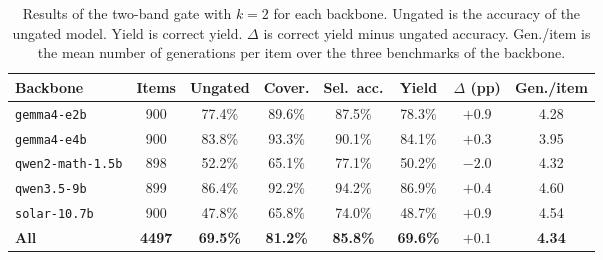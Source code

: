 \begin{table}[t]
\small\setlength{\tabcolsep}{3pt}
\caption{Results of the two-band gate with $k=2$ for each backbone. Ungated is the accuracy of the ungated model. Yield is correct yield. $\Delta$ is correct yield minus ungated accuracy. Gen./item is the mean number of generations per item over the three benchmarks of the backbone.\label{tab:backbones-result}}
\begin{tabularx}{\textwidth}{lCCCCCCC}
\toprule
\textbf{Backbone} & \textbf{Items} & \textbf{Ungated} & \textbf{Cover.} & \textbf{Sel.\ acc.} & \textbf{Yield} & \textbf{$\Delta$ (pp)} & \textbf{Gen./item} \\
\midrule
\texttt{gemma4-e2b} & 900 & 77.4\% & 89.6\% & 87.5\% & 78.3\% & $+0.9$ & 4.28 \\
\texttt{gemma4-e4b} & 900 & 83.8\% & 93.3\% & 90.1\% & 84.1\% & $+0.3$ & 3.95 \\
\texttt{qwen2-math-1.5b} & 898 & 52.2\% & 65.1\% & 77.1\% & 50.2\% & $-2.0$ & 4.32 \\
\texttt{qwen3.5-9b} & 899 & 86.4\% & 92.2\% & 94.2\% & 86.9\% & $+0.4$ & 4.60 \\
\texttt{solar-10.7b} & 900 & 47.8\% & 65.8\% & 74.0\% & 48.7\% & $+0.9$ & 4.54 \\
\midrule
\textbf{All} & \textbf{4497} & \textbf{69.5\%} & \textbf{81.2\%} & \textbf{85.8\%} & \textbf{69.6\%} & \textbf{$+0.1$} & \textbf{4.34} \\
\bottomrule
\end{tabularx}
\end{table}
